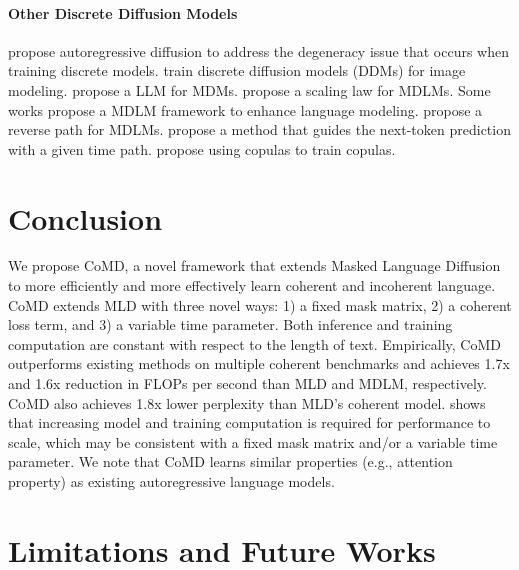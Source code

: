 \documentclass{article} %
\newcommand{\ours}{\textsc{CoMD}\xspace}
\begin{document}
\paragraph{Other Discrete Diffusion Models}
\citet{hoogeboom2021argmax,hoogeboom2022autoregressive} propose autoregressive diffusion to address the degeneracy issue that occurs when training discrete models. \citet{chang2022maskgit} train discrete diffusion models (DDMs) for image modeling. \citet{wang2024diffusion} propose a LLM for MDMs. \citet{gong2024scaling} propose a scaling law for MDLMs. Some works propose a MDLM framework to enhance language modeling. \citet{ye2024beyond} propose a reverse path for MDLMs. \citet{peng2025path} propose a method that guides the next-token prediction with a given time path. \citet{liu2024copula} propose using copulas to train copulas.


\section{Conclusion}

We propose CoMD, a novel framework that extends Masked Language Diffusion to more efficiently and more effectively learn coherent and incoherent language. CoMD extends MLD with three novel ways: 1) a fixed mask matrix, 2) a coherent loss term, and 3) a variable time parameter. Both inference and training computation are constant with respect to the length of text. Empirically, CoMD outperforms existing methods on multiple coherent benchmarks and achieves 1.7x and 1.6x reduction in FLOPs per second than MLD and MDLM, respectively. \ours also achieves 1.8x lower perplexity than MLD's coherent model. \citet{kaplan2020scaling} shows that increasing model and training computation is required for performance to scale, which may be consistent with a fixed mask matrix and/or a variable time parameter. We note that CoMD learns similar properties (e.g., attention property) as existing autoregressive language models. 


\section{Limitations and Future Works}
\end{document}
